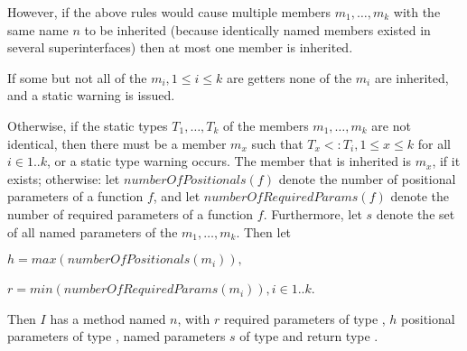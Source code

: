 \documentclass{article}
\begin{document}


\LMHash{}
However, if the above rules would cause multiple members $m_1, \ldots,  m_k$ with the same name $n$ to be inherited (because identically named members existed in several superinterfaces) then at most one member is inherited.

\LMHash{}
If some but not all of the $m_i, 1 \le i \le k$ are getters none of the $m_i$ are inherited, and a static warning is issued.

\LMHash{}
Otherwise, if the static types $T_1, \ldots,  T_k$ of the members $m_1, \ldots,  m_k$  are not identical, then there must be a member $m_x$ such that $T_x <: T_i, 1 \le x \le k$ for all  $i  \in 1..k$, or a static type warning occurs. The member that is inherited  is $m_x$, if it exists; otherwise:
 let $numberOfPositionals(f)$ denote the number of positional parameters of a function $f$, and let $numberOfRequiredParams(f)$ denote the number of required parameters of a function $f$. Furthermore, let $s$ denote the set of all named parameters of the $m_1, \ldots,  m_k$.  Then let

$h = max(numberOfPositionals(m_i)), $

$r = min(numberOfRequiredParams(m_i)), i \in 1..k$.

\LMHash{}
Then $I$ has a method named $n$, with $r$ required parameters of type \DYNAMIC{}, $h$  positional parameters of type \DYNAMIC{}, named parameters $s$ of type  \DYNAMIC{} and  return type  \DYNAMIC{}.




\end{document}
